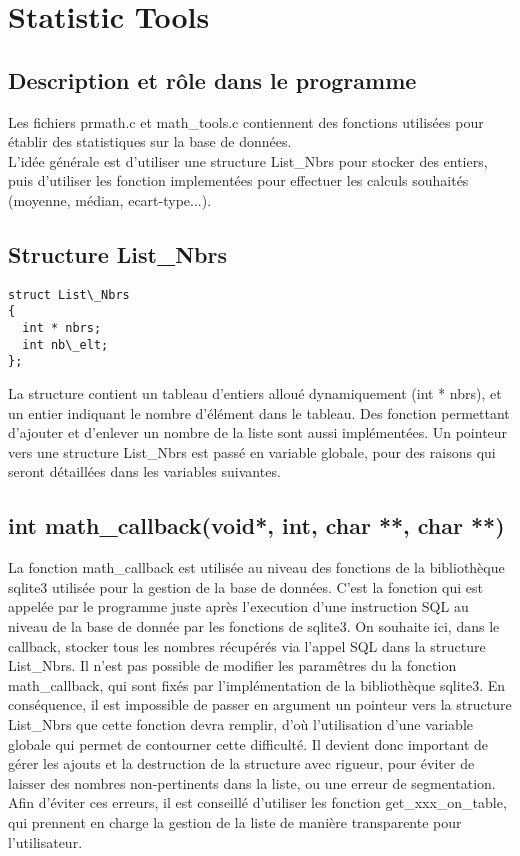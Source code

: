 \section{Statistic Tools} 

\subsection{Description et rôle dans le programme}
Les fichiers prmath.c et math\_tools.c contiennent des fonctions utilisées pour établir des statistiques sur la base de données.\\
L'idée générale est d'utiliser une structure List\_Nbrs pour stocker des entiers, puis d'utiliser les fonction implementées pour effectuer les calculs souhaités (moyenne, médian, ecart-type...).
\subsection{Structure List\_Nbrs}
\begin{verbatim}
struct List\_Nbrs
{
  int * nbrs;
  int nb\_elt;
};
\end{verbatim}
La structure contient un tableau d'entiers alloué dynamiquement (int * nbrs), et un entier indiquant le nombre d'élément dans le tableau. Des fonction permettant d'ajouter et d'enlever un nombre de la liste sont aussi implémentées. Un pointeur vers une structure List\_Nbrs est passé en variable globale, pour des raisons qui seront détaillées dans les variables suivantes.
\subsection{int math\_callback(void*, int, char **, char **)}
La fonction math\_callback est utilisée au niveau des fonctions de la bibliothèque sqlite3 utilisée pour la gestion de la base de données. C'est la fonction qui est appelée par le programme juste après l'execution d'une instruction SQL au niveau de la base de donnée par les fonctions de sqlite3. On souhaite ici, dans le callback, stocker tous les nombres récupérés via l'appel SQL dans la structure List\_Nbrs. Il n'est pas possible de modifier les paramêtres du la fonction math\_callback, qui sont fixés par l'implémentation de la bibliothèque sqlite3. En conséquence, il est impossible de passer en argument un pointeur vers la structure List\_Nbrs que cette fonction devra remplir, d'où l'utilisation d'une variable globale qui permet de contourner cette difficulté. Il devient donc important de gérer les ajouts et la destruction de la structure avec rigueur, pour éviter de laisser des nombres non-pertinents dans la liste, ou une erreur de segmentation. Afin d'éviter ces erreurs, il est conseillé d'utiliser les fonction get\_xxx\_on\_table, qui prennent en charge la gestion de la liste de manière transparente pour l'utilisateur.
